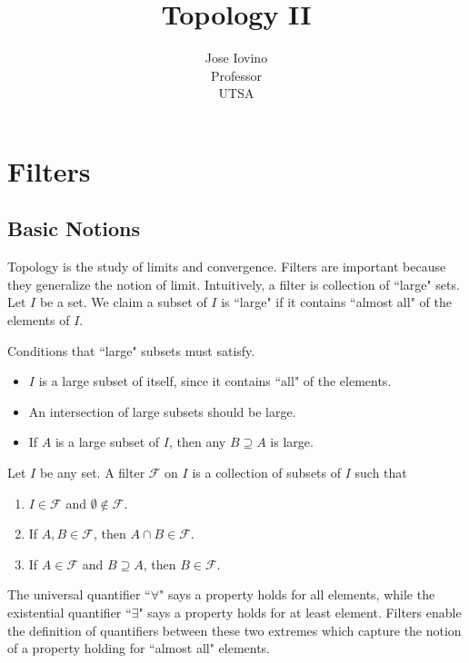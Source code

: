 \documentclass[12pt]{article}
\newenvironment{definition}[2][Definition]{\begin{trivlist}
\item[\hskip \labelsep {\bfseries #1}\hskip \labelsep {\bfseries #2.}]}{\end{trivlist}}
\begin{document}
\date{}

 
\title{Topology II}
\author{Jose Iovino\\Professor \\UTSA} 
 
\maketitle
\section{Filters}
\subsection{Basic Notions}
Topology is the study of limits and convergence.  Filters are important because they generalize the notion of limit.  Intuitively, a filter is collection of ``large" sets.  Let $I$ be a set.  We claim a subset of $I$ is ``large" if it contains ``almost all" of the elements of $I$. 

Conditions that ``large" subsets must satisfy.
\begin{itemize}
  \item $I$ is a large subset of itself, since it contains ``all" of the elements.
  \item An intersection of large subsets should be large.
  \item If $A$ is a large subset of $I$, then any $B \supseteq A$ is large.
\end{itemize}

\begin{definition}{filter}
Let $I$ be any set.  A filter $\mathcal{F}$ on $I$ is a collection of subsets of $I$ such that
\begin{enumerate}
    \item $I \in \mathcal{F}$ and $\emptyset \not\in \mathcal{F}$.
    \item If $A, B \in \mathcal{F}$, then $A \cap B \in \mathcal{F}$.
    \item If $A \in \mathcal{F}$ and $B \supseteq A$, then $B \in \mathcal{F}$.
\end{enumerate}
\end{definition}

The universal quantifier ``$\forall$" says a property holds for all elements, while the existential quantifier ``$\exists$" says a property holds for at least element.  Filters enable the definition of quantifiers between these two extremes which capture the notion of a property holding for ``almost all" elements.
\end{document}
